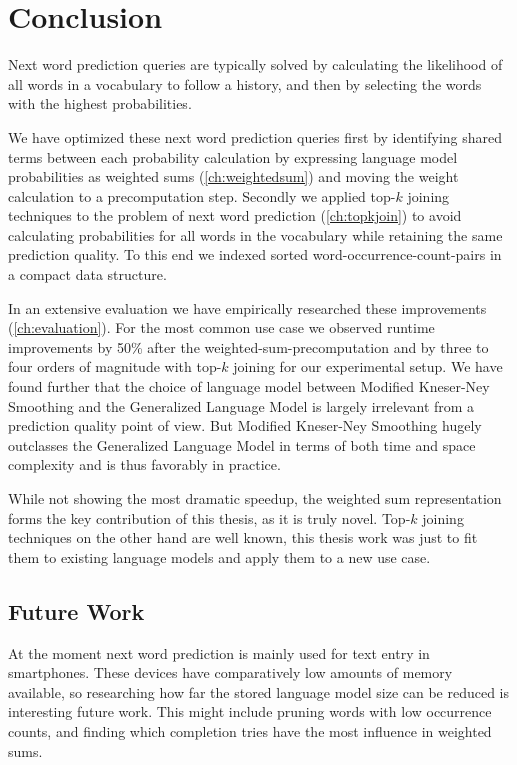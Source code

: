 \chapter{Conclusion}
\label{ch:conclusion}

Next word prediction queries are typically solved by calculating the likelihood
of all words in a vocabulary to follow a history, and then by selecting the
words with the highest probabilities.

We have optimized these next word prediction queries first by identifying
shared terms between each probability calculation by expressing language model
probabilities as weighted sums (\cref{ch:weightedsum}) and moving the weight
calculation to a precomputation step.
Secondly we applied top-$k$ joining techniques to the problem of next word
prediction (\cref{ch:topkjoin}) to avoid calculating probabilities for all words
in the vocabulary while retaining the same prediction quality.
To this end we indexed sorted word-occurrence-count-pairs in a compact data
structure.

In an extensive evaluation we have empirically researched these improvements
(\cref{ch:evaluation}).
For the most common use case we observed runtime improvements by 50\% after the
weighted-sum-pre\-com\-pu\-ta\-tion and by three to four orders of magnitude
with top-$k$ joining for our experimental setup.
We have found further that the choice of language model between Modified
Kneser-Ney Smoothing and the Generalized Language Model is largely irrelevant
from a prediction quality point of view.
But Modified Kneser-Ney Smoothing hugely outclasses the Generalized Language
Model in terms of both time and space complexity and is thus favorably in
practice.

While not showing the most dramatic speedup, the weighted sum representation
forms the key contribution of this thesis, as it is truly novel.
Top-$k$ joining techniques on the other hand are well known, this thesis work
was just to fit them to existing language models and apply them to a new use
case.

\section{Future Work}

At the moment next word prediction is mainly used for text entry in smartphones.
These devices have comparatively low amounts of memory available, so researching
how far the stored language model size can be reduced is interesting future
work.
This might include pruning words with low occurrence counts, and finding which
completion tries have the most influence in weighted sums.

